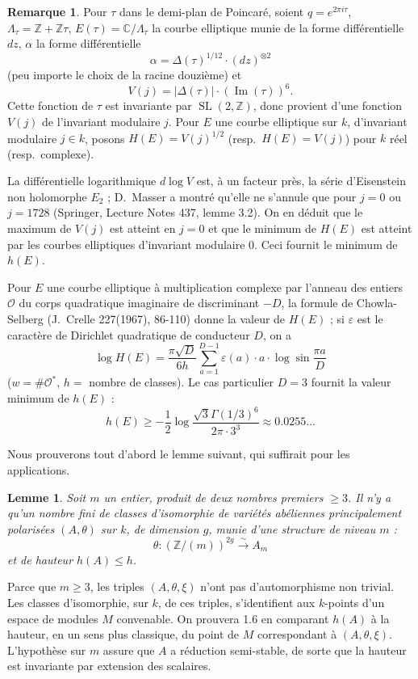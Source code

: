 \documentclass[12pt,a4paper]{article}
\theoremstyle{plain}
\newtheorem{lemma}[theorem]{Lemme}
\theoremstyle{definition}
\newtheorem{remark}[theorem]{Remarque}
\theoremstyle{remark}
\DeclareMathOperator{\Impartie}{Im}
\newcommand{\CC}{\mathbb{C}}
\newcommand{\ZZ}{\mathbb{Z}}
\newcommand{\cO}{\mathcal{O}}
\providecommand{\CC}{\mathbb{C}}
\providecommand{\ZZ}{\mathbb{Z}}
\providecommand{\cO}{\mathcal{O}}
\providecommand{\SL}{\operatorname{SL}}
\begin{document}
\begin{remark}
Pour $\tau$ dans le demi-plan de Poincaré, soient $q = e^{2\pi i \tau}$, $\Lambda_\tau = \ZZ + \ZZ\tau$, $E(\tau) = \CC/\Lambda_\tau$ la courbe elliptique munie de la forme différentielle $dz$, $\alpha$ la forme différentielle
\[
\alpha = \Delta(\tau)^{1/12} \cdot (dz)^{\otimes 2}
\]
(peu importe le choix de la racine douzième) et
\[
V(j) = |\Delta(\tau)| \cdot (\Impartie(\tau))^6.
\]
Cette fonction de $\tau$ est invariante par $\SL(2,\ZZ)$, donc provient d'une fonction $V(j)$ de l'invariant modulaire $j$. Pour $E$ une courbe elliptique sur $k$, d'invariant modulaire $j \in k$, posons $H(E) = V(j)^{1/2}$ (resp.\ $H(E) = V(j)$) pour $k$ réel (resp.\ complexe).

La différentielle logarithmique $d\log V$ est, à un facteur près, la série d'Eisenstein non holomorphe $E_2$ ; D.~Masser a montré qu'elle ne s'annule que pour $j = 0$ ou $j = 1728$ (Springer, Lecture Notes 437, lemme 3.2). On en déduit que le maximum de $V(j)$ est atteint en $j = 0$ et que le minimum de $H(E)$ est atteint par les courbes elliptiques d'invariant modulaire $0$. Ceci fournit le minimum de $h(E)$.

Pour $E$ une courbe elliptique à multiplication complexe par l'anneau des entiers $\cO$ du corps quadratique imaginaire de discriminant $-D$, la formule de Chowla-Selberg (J.~Crelle 227(1967), 86-110) donne la valeur de $H(E)$ ; si $\varepsilon$ est le caractère de Dirichlet quadratique de conducteur $D$, on a
\[
\log H(E) = \frac{\pi \sqrt{D}}{6h} \sum_{a=1}^{D-1} \varepsilon(a) \cdot a \cdot \log \sin\frac{\pi a}{D}
\]
($w = \#\cO^*$, $h =$ nombre de classes). Le cas particulier $D = 3$ fournit la valeur minimum de $h(E)$ :
\[
h(E) \geq -\frac{1}{2} \log\frac{\sqrt{3}\Gamma(1/3)^6}{2\pi \cdot 3^3} \approx 0.0255\ldots
\]
\end{remark}

Nous prouverons tout d'abord le lemme suivant, qui suffirait pour les applications.

\begin{lemma}
Soit $m$ un entier, produit de deux nombres premiers $\geq 3$. Il n'y a qu'un nombre fini de classes d'isomorphie de variétés abéliennes principalement polarisées $(A,\theta)$ sur $k$, de dimension $g$, munie d'une structure de niveau $m$ :
\[
\theta : (\ZZ/(m))^{2g} \xrightarrow{\sim} A_m
\]
et de hauteur $h(A) \leq h$.
\end{lemma}

Parce que $m \geq 3$, les triples $(A,\theta,\xi)$ n'ont pas d'automorphisme non trivial. Les classes d'isomorphie, sur $k$, de ces triples, s'identifient aux $k$-points d'un espace de modules $M$ convenable. On prouvera 1.6 en comparant $h(A)$ à la hauteur, en un sens plus classique, du point de $M$ correspondant à $(A,\theta,\xi)$. L'hypothèse sur $m$ assure que $A$ a réduction semi-stable, de sorte que la hauteur est invariante par extension des scalaires.
\end{document}
